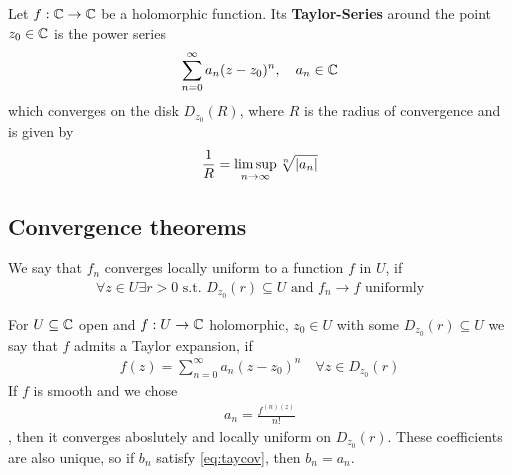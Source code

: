 \begin{definition}
	Let $f: \mathbb{C} \to \mathbb{C}$ be a holomorphic function. Its \textbf{Taylor-Series} around the point $z_0 \in \mathbb{C}$ is the power series
	\begin{align*}
		\sum_{n=0}^{\infty} a_n(z - z_0)^n, \quad a_n \in \mathbb{C}
	\end{align*}
	which converges on the disk $D_{z_0}(R)$, where $R$ is the radius of convergence and is given by
	\begin{align*}
		\frac{1}{R} = \limsup_{n \to \infty} \sqrt[n]{\vert a_n\vert}
	\end{align*}
\end{definition}

\subsection{Convergence theorems}

\begin{definition}[]
	We say that $f_n$ converges locally uniform to a function $f$ in $U$, if
	\begin{align*}
		\forall z \in U \exists r > 0 \text{ s.t. } D_{z_0}(r) \subseteq U \text{ and } f_n \to f \text{ uniformly}
	\end{align*}
\end{definition}
For $U \subseteq \mathbb{C}$ open and $f: U \to \mathbb{C}$ holomorphic, $z_0 \in U$ with some $D_{z_0}(r) \subseteq U$ we say that $f$ admits a Taylor expansion, if 
\begin{align} \label{eq:tayconv}
	f(z) = \sum_{n=0}^{\infty} a_n(z - z_0)^n \quad \forall z \in D_{z_0}(r)
\end{align}
If $f$ is smooth and we chose
\begin{align*}
	a_n = \frac{f^{(n)(z)}}{n!}
\end{align*}
, then it converges aboslutely and locally uniform on $D_{z_0}(r)$.
These coefficients are also unique, so if $b_n$ satisfy \ref{eq:taycov}, then $b_n = a_n$.\\



